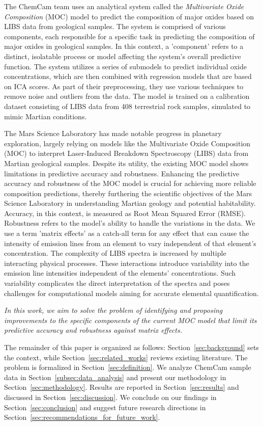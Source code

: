 The ChemCam team uses an analytical system called the \textit{Multivariate Oxide Composition} (MOC) model to predict the composition of major oxides based on LIBS data from geological samples. 
The system is comprised of various components, each responsible for a specific task in predicting the composition of major oxides in geological samples.
In this context, a 'component' refers to a distinct, isolatable process or model affecting the system's overall predictive function.
The system utilizes a series of submodels to predict individual oxide concentrations, which are then combined with regression models that are based on ICA scores.
As part of their preprocessing, they use various techniques to remove noise and outliers from the data.\cite{cleggRecalibrationMarsScience2017}
The model is trained on a calibration dataset consisting of LIBS data from 408 terrestrial rock samples, simulated to mimic Martian conditions\cite{cleggRecalibrationMarsScience2017}.

The Mars Science Laboratory has made notable progress in planetary exploration, largely relying on models like the Multivariate Oxide Composition (MOC) to interpret Laser-Induced Breakdown Spectroscopy (LIBS) data from Martian geological samples.
Despite its utility, the existing MOC model shows limitations in predictive accuracy and robustness.
Enhancing the predictive accuracy and robustness of the MOC model is crucial for achieving more reliable composition predictions, thereby furthering the scientific objectives of the Mars Science Laboratory in understanding Martian geology and potential habitability.
Accuracy, in this context, is measured as Root Mean Squared Error (RMSE).
Robustness refers to the model's ability to handle the variations in the data.
We use a term 'matrix effects' as a catch-all term for any effect that can cause the intensity of emission lines from an element to vary independent of that element's concentration.
The complexity of LIBS spectra is increased by multiple interacting physical processes.
These interactions introduce variability into the emission line intensities independent of the elements' concentrations.
Such variability complicates the direct interpretation of the spectra and poses challenges for computational models aiming for accurate elemental quantification.\cite{andersonImprovedAccuracyQuantitative2017}

\textit{In this work, we aim to solve the problem of identifying and proposing improvements to the specific components of the current MOC model that limit its predictive accuracy and robustness against matrix effects.}

The remainder of this paper is organized as follows:
Section~\ref{sec:background} sets the context, while Section~\ref{sec:related_works} reviews existing literature.
The problem is formalized in Section~\ref{sec:definition}.
We analyze ChemCam sample data in Section~\ref{subsec:data_analysis} and present our methodology in Section~\ref{sec:methodology}.
Results are reported in Section~\ref{sec:results} and discussed in Section~\ref{sec:discussion}.
We conclude on our findings in Section~\ref{sec:conclusion} and suggest future research directions in Section~\ref{sec:recommendations_for_future_work}.
